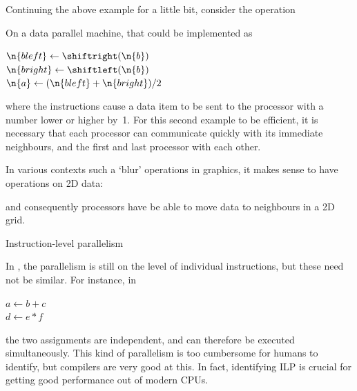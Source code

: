 Continuing the above example for a little bit, consider the operation

\begin{displayalgorithm}
\end{displayalgorithm}

On a data parallel machine, that could be implemented as

\begin{displayalgorithm}
  $\n{bleft} \leftarrow \shiftright(\n{b})$\\
  $\n{bright} \leftarrow \shiftleft(\n{b})$\\
  $\n{a} \leftarrow (\n{bleft}+\n{bright})/2$
\end{displayalgorithm}

where the  instructions cause a data item to be
sent to the processor with a number lower or higher by~1.
%
For this second example to be efficient, it is necessary that each
processor can communicate quickly with its immediate neighbours, and
the first and last processor with each other. 

In
various contexts such a `blur' operations in graphics, it makes sense
to have operations on 2D data:

\begin{displayalgorithm}
\end{displayalgorithm}

and consequently processors have be able to move data to neighbours in
a 2D grid.

 {Instruction-level parallelism}
\label{sec:ILP}

In , the parallelism is still on the level of individual
instructions, but these need not be similar. For instance, in 

\begin{displayalgorithm}
  $a\leftarrow b+c$\\ $d\leftarrow e*f$
\end{displayalgorithm}

the two assignments are independent, and can therefore be executed
simultaneously. This kind of parallelism is too cumbersome for humans
to identify, but compilers are very good at this. In
fact, identifying \ac{ILP} is crucial for getting good performance out
of modern  CPUs.


